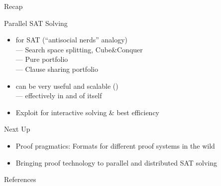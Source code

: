 \documentclass[t,english]{sdqbeamer}
\newcommand{\iflecture}[1]{#1}
\begin{document}
\begin{frame}{Recap}
	\begin{blueblock}{Parallel SAT Solving}
		\begin{itemize}\setlength{\itemsep}{1ex}
			\iflecture{
				\item {} for SAT (``antisocial nerds'' analogy)\\
				--- Search space splitting, Cube\&Conquer\\
				--- Pure portfolio\\
				--- Clause sharing portfolio
			}
			\item {} can be very useful and scalable ()  %
			\\
			---  effectively in and of itself
			\item Exploit  for interactive solving \& best efficiency
		\end{itemize}
	\end{blueblock}
	
	\begin{block}{Next Up}
		\begin{itemize}
			\item Proof pragmatics: Formats for different proof systems in the wild
			\item Bringing proof technology to parallel and distributed SAT solving
		\end{itemize}
	\end{block}
\end{frame}


\begin{frame}[allowframebreaks]{References}
	\renewcommand*{\bibfont}{\footnotesize}
	\printbibliography[heading=subbibliography]
\end{frame}
\end{document}
